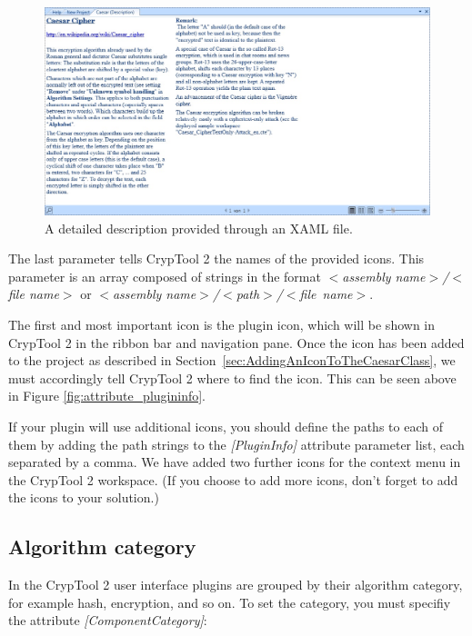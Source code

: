 \begin{figure}[h!]
	\centering
		\includegraphics[width=1.00\textwidth]{figures/xaml_description.jpg}
	\caption{A detailed description provided through an XAML file.}
	\label{fig:xaml_description}
\end{figure}

The last parameter tells CrypTool 2 the names of the provided icons. This parameter is an array composed of strings in the format \textit{$<$assembly name$>$/$<$file name$>$} or \textit{$<$assembly name$>$/$<$path$>$/\linebreak $<$file~name$>$}.

The first and most important icon is the plugin icon, which will be shown in CrypTool 2 in the ribbon bar and navigation pane. Once the icon has been added to the project as described in Section~\ref{sec:AddingAnIconToTheCaesarClass}, we must accordingly tell CrypTool 2 where to find the icon. This can be seen above in Figure \ref{fig:attribute_plugininfo}.

If your plugin will use additional icons, you should define the paths to each of them by adding the path strings to the \textit{[PluginInfo]} attribute parameter list, each separated by a comma. We have added two further icons for the context menu in the CrypTool 2 workspace. (If you choose to add more icons, don't forget to add the icons to your solution.)

\subsection{Algorithm category}
\label{sec:AlgorithmCategory}

In the CrypTool 2 user interface plugins are grouped by their algorithm category, for example hash, encryption, and so on. To set the category, you must specifiy the attribute \textit{[ComponentCategory]}:

